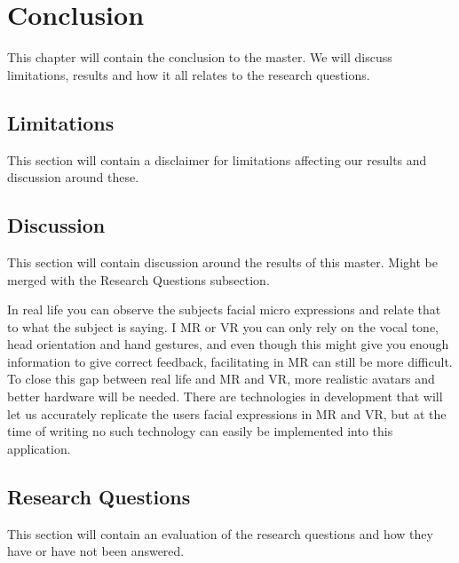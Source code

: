 \chapter{Conclusion}
This chapter will contain the conclusion to the master. We will discuss limitations, results and how it all relates to the research questions.

    \section{Limitations}
    This section will contain a disclaimer for limitations affecting our results and discussion around these.
    
    \section{Discussion}
    This section will contain discussion around the results of this master. Might be merged with the Research Questions subsection.
    
    In real life you can observe the subjects facial micro expressions and relate that to what the subject is saying. I MR or VR you can only rely on the vocal tone, head orientation and hand gestures, and even though this might give you enough information to give correct feedback, facilitating in MR can still be more difficult. To close this gap between real life and MR and VR, more realistic avatars and better hardware will be needed. There are technologies in development that will let us accurately replicate the users facial expressions in MR and VR, but at the time of writing no such technology can easily be implemented into this application.
    
    \section{Research Questions}
    This section will contain an evaluation of the research questions and how they have or have not been answered.